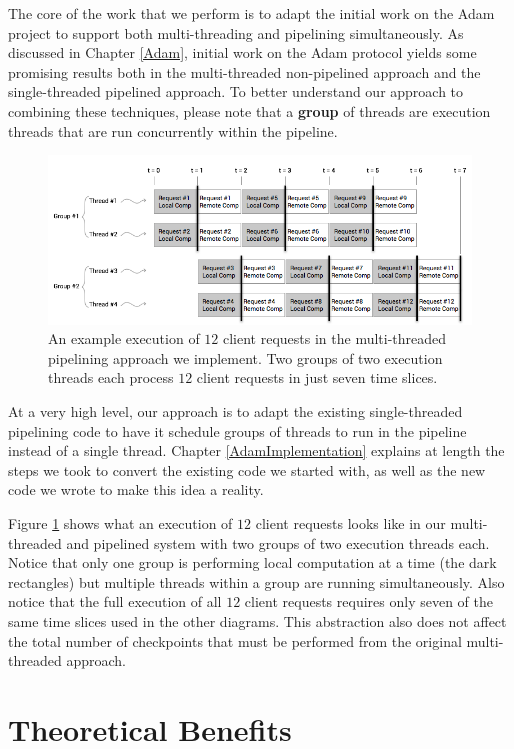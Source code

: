 \documentclass[11pt, oneside]{report}
\begin{document}
The core of the work that we perform is to adapt the initial work on the Adam project to support both multi-threading and pipelining simultaneously.
As discussed in Chapter \ref{Adam}, initial work on the Adam protocol yields some promising results both in the multi-threaded non-pipelined approach and the single-threaded pipelined approach. 
To better understand our approach to combining these techniques, please note that a \textbf{group} of threads are execution threads that are run concurrently within the pipeline.

\begin{figure}[h]
\centering
\includegraphics[width=1.0\textwidth]{PipelinedParallel.png}
\caption{\label{parpipe}An example execution of $12$ client requests in the multi-threaded pipelining approach we implement. Two groups of two execution threads each process $12$ client requests in just seven time slices.}
\end{figure}

At a very high level, our approach is to adapt the existing single-threaded pipelining code to have it schedule groups of threads to run in the pipeline instead of a single thread. 
Chapter \ref{AdamImplementation} explains at length the steps we took to convert the existing code we started with, as well as the new code we wrote to make this idea a reality.

Figure \ref{parpipe} shows what an execution of $12$ client requests looks like in our multi-threaded and pipelined system with two groups of two execution threads each. 
Notice that only one group is performing local computation at a time (the dark rectangles) but multiple threads within a group are running simultaneously.
Also notice that the full execution of all $12$ client requests requires only seven of the same time slices used in the other diagrams.
This abstraction also does not affect the total number of checkpoints that must be performed from the original multi-threaded approach.

\section{Theoretical Benefits}
\end{document}
